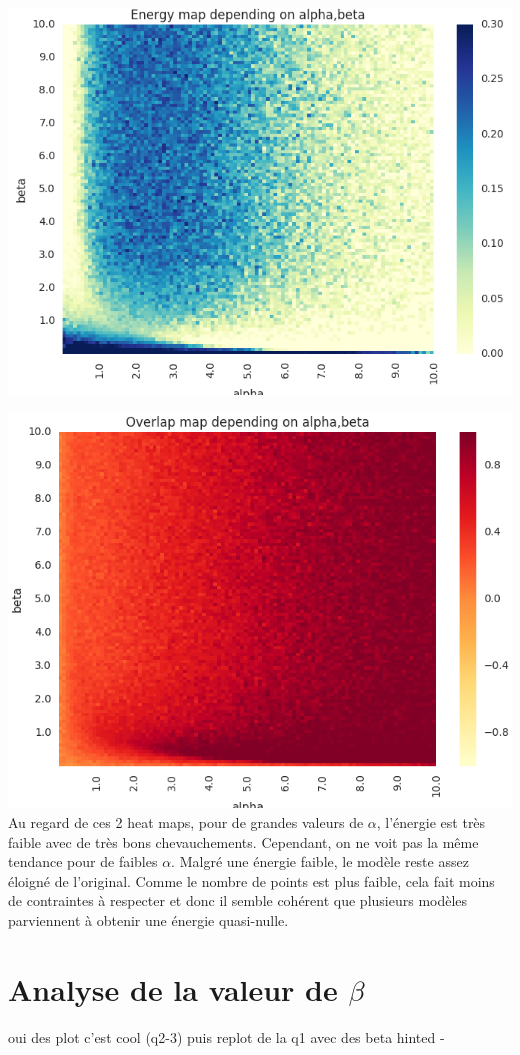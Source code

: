 \documentclass[twocolumn]{article}
\begin{document}
		
		\includegraphics[width=\columnwidth]{../tobekept/ex2_2323132067031870085-r.png}
		
		\includegraphics[width=\columnwidth]{../tobekept/ex3_2323132067031870085-r.png}
		Au regard de ces 2 heat maps, pour de grandes valeurs de $\alpha$, l'énergie est très faible avec de très bons chevauchements. Cependant, on ne voit pas la même tendance pour de faibles $\alpha$. Malgré une énergie faible, le modèle reste assez éloigné de l'original. Comme le nombre de points est plus faible, cela fait moins de contraintes à respecter et donc il semble cohérent que plusieurs modèles parviennent à obtenir une énergie quasi-nulle. 
	\section{Analyse de la valeur de $\beta$}
		oui des plot c'est cool (q2-3)
		puis replot de la q1 avec des beta hinted
		- 
\end{document}
